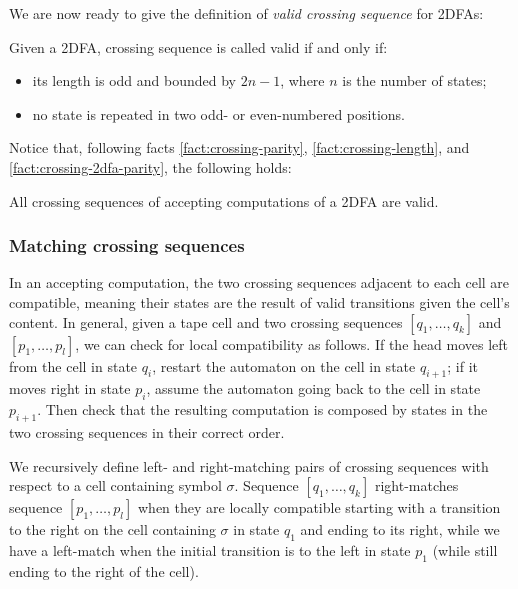 We are now ready to give the definition of \emph{valid crossing sequence} for 2DFAs:
\begin{defn}
	Given a 2DFA, crossing sequence is called valid if and only if:
	\begin{itemize}
		\item its length is odd and bounded by $2n-1$, where $n$ is the number of states;
		\item no state is repeated in two odd- or even-numbered positions.
	\end{itemize}
\end{defn}


Notice that, following facts \ref{fact:crossing-parity}, \ref{fact:crossing-length}, and \ref{fact:crossing-2dfa-parity}, the following holds:
\begin{fact}
	All crossing sequences of accepting computations of a 2DFA are valid.
\end{fact}

\subsubsection{Matching crossing sequences}
In an accepting computation, the two crossing sequences adjacent to each cell are compatible, meaning their states are the result of valid transitions given the cell's content.
In general, given a tape cell and two crossing sequences $[q_1,\dots,q_k]$ and $[p_1,\dots,p_l]$, we can check for local compatibility as follows.
If the head moves left from the cell in state $q_i$, restart the automaton on the cell in state $q_{i+1}$; if it moves right in state $p_i$, assume the automaton going back to the cell in state $p_{i+1}$.
Then check that the resulting computation is composed by states in the two crossing sequences in their correct order.

We recursively define left- and right-matching pairs of crossing sequences with respect to a cell containing symbol $\sigma$.
Sequence $[q_1,\dots,q_k]$ right-matches sequence $[p_1,\dots,p_l]$ when they are locally compatible starting with a transition to the right on the cell containing $\sigma$ in state $q_1$ and ending to its right, while we have a left-match when the initial transition is to the left in state $p_1$ (while still ending to the right of the cell).

